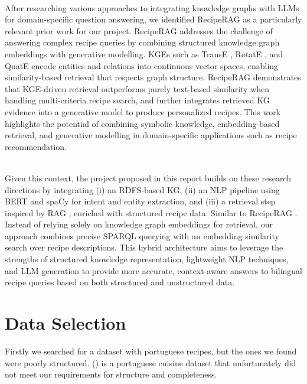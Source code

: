 \documentclass{article}
\begin{document}
\noindent
\\
After researching various approaches to integrating knowledge graphs with LLMs for domain-specific question answering, we identified RecipeRAG \cite{loesch2025reciperag} as a particularly relevant prior work for our project. RecipeRAG addresses the challenge of answering complex recipe queries by combining structured knowledge graph embeddings with generative modelling. KGEs such as TransE \cite{bordes2013translating}, RotatE \cite{sun2019rotate}, and QuatE \cite{zhang2019quaternion} encode entities and relations into continuous vector spaces, enabling similarity-based retrieval that respects graph structure. RecipeRAG demonstrates that KGE-driven retrieval outperforms purely text-based similarity when handling multi-criteria recipe search, and further integrates retrieved KG evidence into a generative model to produce personalized recipes. This work highlights the potential of combining symbolic knowledge, embedding-based retrieval, and generative modelling in domain-specific applications such as recipe recommendation.


\noindent
\\
Given this context, the project proposed in this report builds on these research directions by integrating (i) an RDFS-based KG, (ii) an NLP pipeline using BERT \cite{devlin2019bert} and spaCy \cite{honnibal2020spacy} for intent and entity extraction, and (iii) a retrieval step inspired by RAG \cite{lewis2020rag}, enriched with structured recipe data. Similar to RecipeRAG \cite{loesch2025reciperag}. Instead of relying solely on knowledge graph embeddings for retrieval, our approach combines precise SPARQL querying with an embedding similarity search over recipe descriptions.
This hybrid architecture aims to leverage the strengths of structured knowledge representation, lightweight NLP techniques, and LLM generation to provide more accurate, context-aware answers to bilingual recipe queries based on both structured and unstructured data.


\section{Data Selection}



\noindent

\noindent
Firstly we searched for a dataset with portuguese recipes, but the ones we found were poorly structured.
(\cite{portuguese_meals_kaggle}) is a portuguese cuisine dataset that unfortunately did not meet our requirements for structure and completeness.
\end{document}
